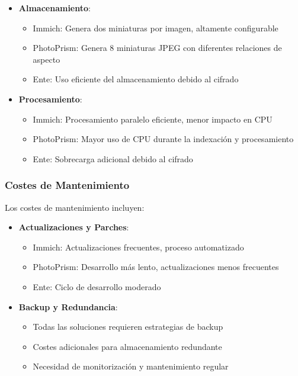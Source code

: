 \begin{itemize}
    \item \textbf{Almacenamiento}:
    \begin{itemize}
        \item Immich: Genera dos miniaturas por imagen, altamente configurable
        \item PhotoPrism: Genera 8 miniaturas JPEG con diferentes relaciones de aspecto
        \item Ente: Uso eficiente del almacenamiento debido al cifrado
    \end{itemize}

    \item \textbf{Procesamiento}:
    \begin{itemize}
        \item Immich: Procesamiento paralelo eficiente, menor impacto en CPU
        \item PhotoPrism: Mayor uso de CPU durante la indexación y procesamiento
        \item Ente: Sobrecarga adicional debido al cifrado
    \end{itemize}
\end{itemize}

\subsubsection{Costes de Mantenimiento}

Los costes de mantenimiento incluyen:

\begin{itemize}
    \item \textbf{Actualizaciones y Parches}:
    \begin{itemize}
        \item Immich: Actualizaciones frecuentes, proceso automatizado
        \item PhotoPrism: Desarrollo más lento, actualizaciones menos frecuentes
        \item Ente: Ciclo de desarrollo moderado
    \end{itemize}

    \item \textbf{Backup y Redundancia}:
    \begin{itemize}
        \item Todas las soluciones requieren estrategias de backup
        \item Costes adicionales para almacenamiento redundante
        \item Necesidad de monitorización y mantenimiento regular
    \end{itemize}
\end{itemize}

